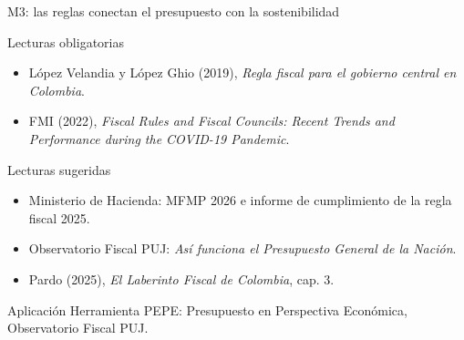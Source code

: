 \begin{frame}{M3: las reglas conectan el presupuesto con la sostenibilidad}
\footnotesize
\begin{block}{Lecturas obligatorias}
  \begin{itemize}
    \item L\'opez Velandia y L\'opez Ghio (2019), \textit{Regla fiscal para el gobierno central en Colombia}.
    \item FMI (2022), \textit{Fiscal Rules and Fiscal Councils: Recent Trends and Performance during the COVID-19 Pandemic}.
  \end{itemize}
\end{block}
\begin{block}{Lecturas sugeridas}
  \begin{itemize}
    \item Ministerio de Hacienda: MFMP 2026 e informe de cumplimiento de la regla fiscal 2025.
    \item Observatorio Fiscal PUJ: \textit{As\'i funciona el Presupuesto General de la Naci\'on}.
    \item Pardo (2025), \textit{El Laberinto Fiscal de Colombia}, cap. 3.
  \end{itemize}
\end{block}
\begin{alertblock}{Aplicaci\'on}
Herramienta PEPE: Presupuesto en Perspectiva Econ\'omica, Observatorio Fiscal PUJ.
\end{alertblock}
\end{frame}

